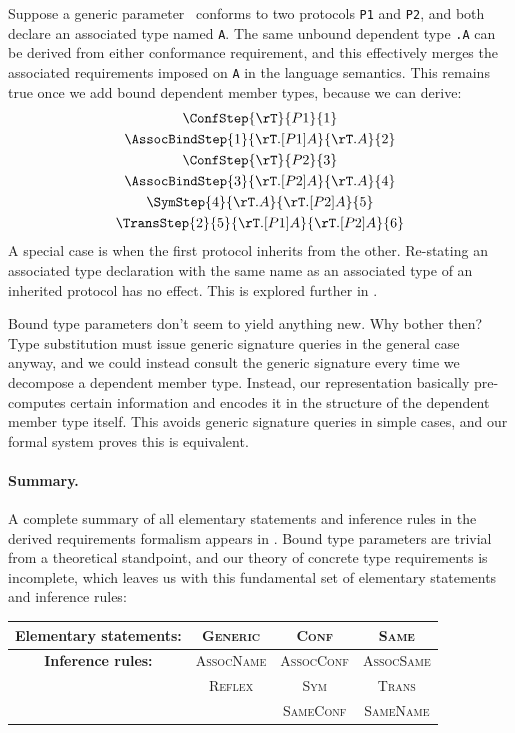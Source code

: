 \documentclass[../generics]{subfiles}
\begin{document}
Suppose a generic parameter \rT\ conforms to two protocols \texttt{P1} and \texttt{P2}, and both declare an associated type named \texttt{A}. The same unbound dependent type \texttt{\rT.A} can be derived from either conformance requirement, and this effectively merges the associated requirements imposed on \texttt{A} in the language semantics. This remains true once we add bound dependent member types, because we can derive:
\begin{gather*}
\ConfStep{\rT}{P1}{1}\\
\AssocBindStep{1}{\rT.[P1]A}{\rT.A}{2}\\
\ConfStep{\rT}{P2}{3}\\
\AssocBindStep{3}{\rT.[P2]A}{\rT.A}{4}\\
\SymStep{4}{\rT.A}{\rT.[P2]A}{5}\\
\TransStep{2}{5}{\rT.[P1]A}{\rT.[P2]A}{6}
\end{gather*}
A special case is when the first protocol inherits from the other. Re-stating an associated type declaration with the same name as an associated type of an inherited protocol has no effect. This is explored further in .

Bound type parameters don't seem to yield anything new. Why bother then? Type substitution must issue generic signature queries in the general case anyway, and we could instead consult the generic signature every time we decompose a dependent member type. Instead, our representation basically pre-computes certain information and encodes it in the structure of the dependent member type itself. This avoids generic signature queries in simple cases, and our formal system proves this is equivalent. 

\paragraph{Summary.}
A complete summary of all elementary statements and inference rules in the derived requirements formalism appears in . Bound type parameters are trivial from a theoretical standpoint, and our theory of concrete type requirements is incomplete, which leaves us with this fundamental set of elementary statements and inference rules:
\begin{center}
\begin{tabular}{cccc}
\toprule
\textbf{Elementary statements:}&\textsc{Generic}&\textsc{Conf}&\textsc{Same}\\
\midrule
\textbf{Inference rules:}&\textsc{AssocName}&\textsc{AssocConf}&\textsc{AssocSame}\\
&\textsc{Reflex}&\textsc{Sym}&\textsc{Trans}\\
&&\textsc{SameConf}&\textsc{SameName}\\
\bottomrule
\end{tabular}
\end{center}
\end{document}
